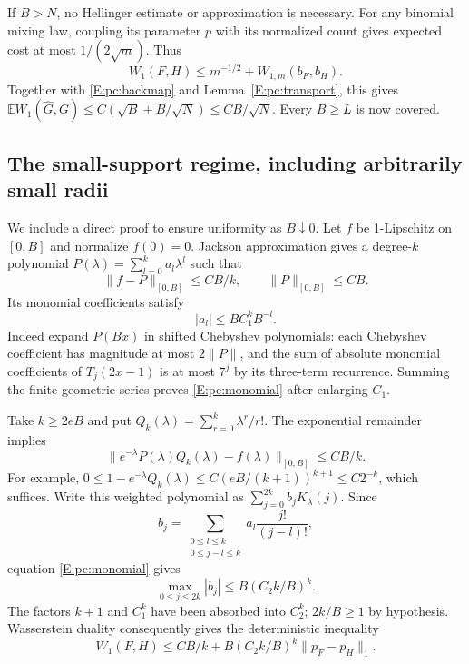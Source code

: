 \documentclass[11pt,a4paper]{article}
\theoremstyle{definition}
\theoremstyle{remark}
\numberwithin{equation}{section}
\begin{document}
If $B>N$, no Hellinger estimate or approximation is necessary.
For any binomial mixing law, coupling its parameter $p$ with its
normalized count gives expected cost at most $1/(2\sqrt m)$.
Thus
\[
 W_1(F,H)\le m^{-1/2}+W_{1,m}(b_F,b_H).
\]
Together with \eqref{E:pc:backmap} and Lemma~\ref{E:pc:transport}, this
gives $\mathbb E W_1(\widehat G,G)\le C(\sqrt B+B/\sqrt N)
\le CB/\sqrt N$.  Every $B\ge L$ is now covered.

\subsection{The small-support regime, including arbitrarily small radii}

We include a direct proof to ensure uniformity as $B\downarrow0$.
Let $f$ be 1-Lipschitz on $[0,B]$ and normalize $f(0)=0$.
Jackson approximation gives a degree-$k$ polynomial
$P(\lambda)=\sum_{l=0}^k a_l\lambda^l$ such that
\[
 \|f-P\|_{[0,B]}\le CB/k,\qquad \|P\|_{[0,B]}\le CB.
\]
Its monomial coefficients satisfy
\begin{equation}\label{E:pc:monomial}
                         |a_l|\le BC_1^kB^{-l}.
\end{equation}
Indeed expand $P(Bx)$ in shifted Chebyshev polynomials: each
Chebyshev coefficient has magnitude at most $2\|P\|$, and the sum
of absolute monomial coefficients of $T_j(2x-1)$ is at most $7^j$
by its three-term recurrence.  Summing the finite geometric series
proves \eqref{E:pc:monomial} after enlarging $C_1$.

Take $k\ge2eB$ and put $Q_k(\lambda)=\sum_{r=0}^k\lambda^r/r!$.
The exponential remainder implies
\[
 \|e^{-\lambda}P(\lambda)Q_k(\lambda)-f(\lambda)\|_{[0,B]}
                                                    \le CB/k.
\]
For example, $0\le1-e^{-\lambda}Q_k(\lambda)
\le C(eB/(k+1))^{k+1}\le C2^{-k}$, which suffices.
Write this weighted polynomial as $\sum_{j=0}^{2k}b_jK_\lambda(j)$.
Since
\[
 b_j=\sum_{\substack{0\le l\le k\\0\le j-l\le k}}
                      a_l\frac{j!}{(j-l)!},
\]
equation \eqref{E:pc:monomial} gives
\begin{equation}\label{E:pc:smallcoeff}
             \max_{0\le j\le2k}|b_j|\le B(C_2 k/B)^k.
\end{equation}
The factors $k+1$ and $C_1^k$ have been absorbed into $C_2^k$;
$2k/B\ge1$ by hypothesis.  Wasserstein duality consequently gives
the deterministic inequality
\begin{equation}\label{E:pc:smallinverse}
 W_1(F,H)\le CB/k+
                B(C_2 k/B)^k\|p_F-p_H\|_1.
\end{equation}
\end{document}

